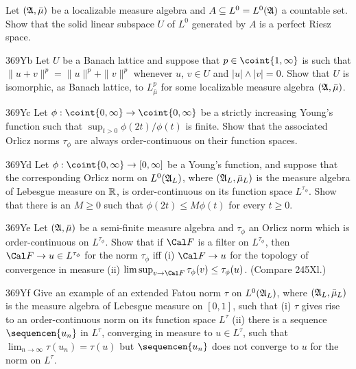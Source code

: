 {
Let $(\frak A,\bar\mu)$ be a localizable measure algebra
and $A\subseteq L^0=L^0(\frak A)$ a countable set.   Show that the solid
linear subspace $U$ of $L^0$ generated by $A$ is a perfect Riesz space.
     
\spheader 369Yb Let $U$ be a Banach lattice and suppose that
$p\in\coint{1,\infty}$ is such that $\|u+v\|^p=\|u\|^p+\|v\|^p$ whenever
$u$, $v\in U$ and $|u|\wedge|v|=0$.   Show that $U$ is isomorphic, as
Banach lattice, to $L^p_{\bar\mu}$ for some localizable measure
algebra $(\frak A,\bar\mu)$.   
     
\spheader 369Yc
Let $\phi:\coint{0,\infty}\to\coint{0,\infty}$ be a strictly increasing
Young's function such that $\sup_{t>0}\phi(2t)/\phi(t)$
is finite.   Show that the associated Orlicz norms $\tau_{\phi}$
are always order-continuous on their function spaces.
     
\spheader 369Yd
Let $\phi:\coint{0,\infty}\to[0,\infty]$ be a Young's function, and
suppose that the corresponding Orlicz norm on
$L^0(\frak A_L)$, where $(\frak A_L,\bar\mu_L)$ is the measure algebra
of Lebesgue measure on $\Bbb R$, is order-continuous on its function
space $L^{\tau_{\phi}}$.   Show that there is an $M\ge 0$ such that
$\phi(2t)\le M\phi(t)$ for every $t\ge 0$.
     
\spheader 369Ye Let $(\frak A,\bar\mu)$ be a semi-finite measure algebra
and $\tau_{\phi}$ an Orlicz norm which is order-continuous on
$L^{\tau_{\phi}}$.
Show that if $\Cal F$ is a filter on $L^{\tau_{\phi}}$, then
$\Cal F\to u\in L^{\tau_{\phi}}$ for the norm $\tau_{\phi}$ iff (i)
$\Cal F\to u$ for the topology of convergence in measure (ii)
$\limsup_{v\to\Cal F}\tau_{\phi}(v)\le\tau_{\phi}(u)$.   (Compare
245Xl.)
     
\spheader 369Yf Give an example of an extended Fatou norm $\tau$ on
$L^0(\frak A_L)$, where $(\frak A_L,\bar\mu_L)$ is the measure algebra
of Lebesgue measure on $[0,1]$, such that (i) $\tau$ gives rise to an
order-continuous norm on its function space $L^{\tau}$ (ii) there is a
sequence $\sequencen{u_n}$ in $L^{\tau}$, converging in measure to $u\in
L^{\tau}$, such that $\lim_{n\to\infty}\tau(u_n)=\tau(u)$ but
$\sequencen{u_n}$ does not converge to $u$ for the norm on $L^{\tau}$.
     
}

